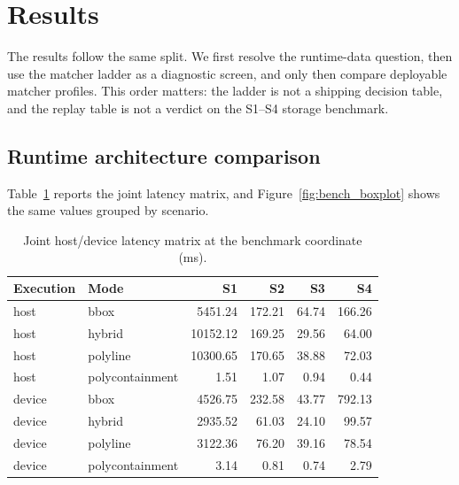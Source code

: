\documentclass{article}
\begin{document}
\section{Results}
The results follow the same split. We first resolve the runtime-data question, then use the matcher ladder as a diagnostic screen, and only then compare deployable matcher profiles. This order matters: the ladder is not a shipping decision table, and the replay table is not a verdict on the S1--S4 storage benchmark.

\subsection{Runtime architecture comparison}
Table~\ref{tab:bench_joint} reports the joint latency matrix, and Figure~\ref{fig:bench_boxplot} shows the same values grouped by scenario.

\begin{table}[!htbp]
\centering
\caption{Joint host/device latency matrix at the benchmark coordinate (\si{\milli\second}).}
\label{tab:bench_joint}
\begin{tabular}{llrrrr}
\toprule
Execution & Mode & S1 & S2 & S3 & S4 \\
\midrule
host & bbox & 5451.24 & 172.21 & 64.74 & 166.26 \\
host & hybrid & 10152.12 & 169.25 & 29.56 & 64.00 \\
host & polyline & 10300.65 & 170.65 & 38.88 & 72.03 \\
host & polycontainment & 1.51 & 1.07 & 0.94 & 0.44 \\
\midrule
device & bbox & 4526.75 & 232.58 & 43.77 & 792.13 \\
device & hybrid & 2935.52 & 61.03 & 24.10 & 99.57 \\
device & polyline & 3122.36 & 76.20 & 39.16 & 78.54 \\
device & polycontainment & 3.14 & 0.81 & 0.74 & 2.79 \\
\bottomrule
\end{tabular}
\end{table}
\end{document}
